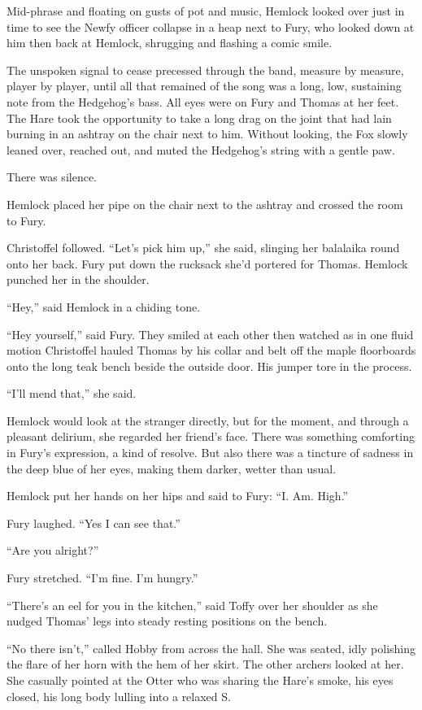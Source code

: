 \documentclass[11pt,a5paper]{article}
\begin{document}
Mid-phrase and floating on gusts of pot and music, Hemlock looked over just in time to see the Newfy officer collapse in a heap next to Fury, who looked down at him then back at Hemlock, shrugging and flashing a comic smile.

The unspoken signal to cease precessed through the band, measure by measure, player by player, until all that remained of the song was a long, low, sustaining note from the Hedgehog's bass. All eyes were on Fury and Thomas at her feet. The Hare took the opportunity to take a long drag on the joint that had lain burning in an ashtray on the chair next to him. Without looking, the Fox slowly leaned over, reached out, and muted the Hedgehog's string with a gentle paw.

There was silence.

Hemlock placed her pipe on the chair next to the ashtray and crossed the room to Fury.

Christoffel followed. ``Let's pick him up,'' she said, slinging her balalaika round onto her back. Fury put down the rucksack she'd portered for Thomas. Hemlock punched her in the shoulder.

``Hey,'' said Hemlock in a chiding tone.

``Hey yourself,'' said Fury. They smiled at each other then watched as in one fluid motion Christoffel hauled Thomas by his collar and belt off the maple floorboards onto the long teak bench beside the outside door. His jumper tore in the process.

``I'll mend that,'' she said.

Hemlock would look at the stranger directly, but for the moment, and through a pleasant delirium, she regarded her friend's face. There was something comforting in Fury's expression, a kind of resolve. But also there was a tincture of sadness in the deep blue of her eyes, making them darker, wetter than usual.

Hemlock put her hands on her hips and said to Fury: ``I. Am. High.''

Fury laughed. ``Yes I can see that.''

``Are you alright?''

Fury stretched. ``I'm fine. I'm hungry.''

``There's an eel for you in the kitchen,'' said Toffy over her shoulder as she nudged Thomas' legs into steady resting positions on the bench.

``No there isn't,'' called Hobby from across the hall. She was seated, idly polishing the flare of her horn with the hem of her skirt. The other archers looked at her. She casually pointed at the Otter who was sharing the Hare's smoke, his eyes closed, his long body lulling into a relaxed S.
\end{document}
